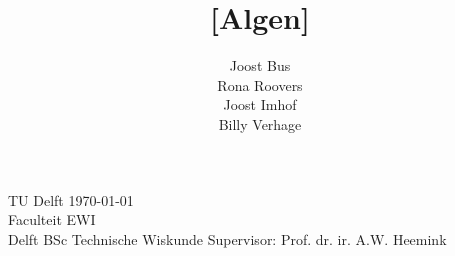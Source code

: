 \documentclass{article}
\begin{document}
	\title{[Algen]}
	\author{Joost Bus\\
	        Rona Roovers\\
	        Joost Imhof\\
			Billy Verhage
			}
	\date{}
	\maketitle
	\vfill
	\noindent
	TU Delft \hfill \today \\
	Faculteit EWI\\ \hfill Delft
	BSc Technische Wiskunde \hfill Supervisor: Prof. dr. ir. A.W. Heemink 
	
	\fancyhf{}
	\fancyhead[C]{\thepage}
	\pagestyle{fancy}
	\renewcommand{\headrulewidth}{0pt}
	\newcommand{\odds}{\textnormal{odds}}

	\thispagestyle{empty}
	
	\newpage
	
	\newpage
	\setcounter{tocdepth}{2}
	\tableofcontents
	
	
	\newpage
	\setcounter{page}{1}
	
	
	
	
	
	\newpage
	

\printbibliography


 	
\end{document}

